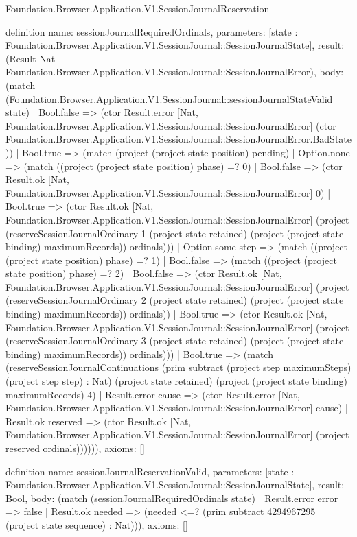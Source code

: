 \begin{lexlean}{Foundation.Browser.Application.V1.SessionJournalReservation}
\begin{semanticmodule}
definition{
  name: sessionJournalRequiredOrdinals,
  parameters: [state : Foundation.Browser.Application.V1.SessionJournal::SessionJournalState],
  result: (Result Nat Foundation.Browser.Application.V1.SessionJournal::SessionJournalError),
  body: (match (Foundation.Browser.Application.V1.SessionJournal::sessionJournalStateValid state)
    | Bool.false => (ctor Result.error [Nat, Foundation.Browser.Application.V1.SessionJournal::SessionJournalError] (ctor Foundation.Browser.Application.V1.SessionJournal::SessionJournalError.BadState))
    | Bool.true => (match (project (project state position) pending)
      | Option.none => (match ((project (project state position) phase) =? 0)
        | Bool.false => (ctor Result.ok [Nat, Foundation.Browser.Application.V1.SessionJournal::SessionJournalError] 0)
        | Bool.true => (ctor Result.ok [Nat, Foundation.Browser.Application.V1.SessionJournal::SessionJournalError] (project (reserveSessionJournalOrdinary 1 (project state retained) (project (project state binding) maximumRecords)) ordinals)))
      | Option.some step => (match ((project (project state position) phase) =? 1)
        | Bool.false => (match ((project (project state position) phase) =? 2)
          | Bool.false => (ctor Result.ok [Nat, Foundation.Browser.Application.V1.SessionJournal::SessionJournalError] (project (reserveSessionJournalOrdinary 2 (project state retained) (project (project state binding) maximumRecords)) ordinals))
          | Bool.true => (ctor Result.ok [Nat, Foundation.Browser.Application.V1.SessionJournal::SessionJournalError] (project (reserveSessionJournalOrdinary 3 (project state retained) (project (project state binding) maximumRecords)) ordinals)))
        | Bool.true => (match (reserveSessionJournalContinuations (prim subtract (project step maximumSteps) (project step step) : Nat) (project state retained) (project (project state binding) maximumRecords) 4)
          | Result.error cause => (ctor Result.error [Nat, Foundation.Browser.Application.V1.SessionJournal::SessionJournalError] cause)
          | Result.ok reserved => (ctor Result.ok [Nat, Foundation.Browser.Application.V1.SessionJournal::SessionJournalError] (project reserved ordinals)))))),
  axioms: []
}

definition{
  name: sessionJournalReservationValid,
  parameters: [state : Foundation.Browser.Application.V1.SessionJournal::SessionJournalState],
  result: Bool,
  body: (match (sessionJournalRequiredOrdinals state)
    | Result.error error => false
    | Result.ok needed => (needed <=? (prim subtract 4294967295 (project state sequence) : Nat))),
  axioms: []
}


\end{semanticmodule}
\end{lexlean}
